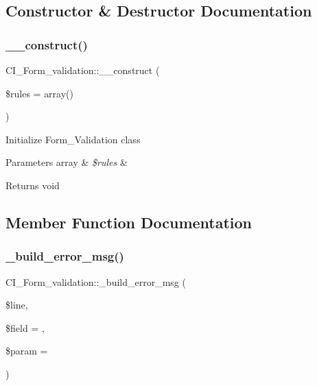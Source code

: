 \subsection{Constructor \& Destructor Documentation}
\mbox{\label{class_c_i___form__validation_aaed5a8bb88ecb0810d3d345658c621a4}} 
\subsubsection{\texorpdfstring{\+\_\+\+\_\+construct()}{\_\_construct()}}
{\footnotesize\ttfamily C\+I\+\_\+\+Form\+\_\+validation\+::\+\_\+\+\_\+construct (\begin{DoxyParamCaption}\item[{}]{\$rules = {\ttfamily array()} }\end{DoxyParamCaption})}

Initialize Form\+\_\+\+Validation class


\begin{DoxyParams}[1]{Parameters}
array & {\em \$rules} & \\
\hline
\end{DoxyParams}
\begin{DoxyReturn}{Returns}
void 
\end{DoxyReturn}


\subsection{Member Function Documentation}
\mbox{\label{class_c_i___form__validation_a5d9a8cef789bdaf9fa921b284124af28}} 
\subsubsection{\texorpdfstring{\+\_\+build\+\_\+error\+\_\+msg()}{\_build\_error\_msg()}}
{\footnotesize\ttfamily C\+I\+\_\+\+Form\+\_\+validation\+::\+\_\+build\+\_\+error\+\_\+msg (\begin{DoxyParamCaption}\item[{}]{\$line,  }\item[{}]{\$field = {\ttfamily \textquotesingle{}\textquotesingle{}},  }\item[{}]{\$param = {\ttfamily \textquotesingle{}\textquotesingle{}} }\end{DoxyParamCaption})\hspace{0.3cm}{\ttfamily [protected]}}

